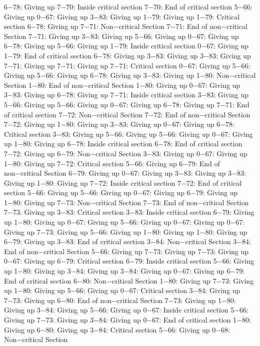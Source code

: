 6−78: Giving up
7−70: Inside critical section
7−70: End of critical section
5−66: Giving up
0−67: Giving up
3−83: Giving up
1−79: Giving up
1−79: Critical section
6−78: Giving up
7−71: Non−critical Section
7−71: End of non−critical Section
7−71: Giving up
3−83: Giving up
5−66: Giving up
0−67: Giving up
6−78: Giving up
5−66: Giving up
1−79: Inside critical section
0−67: Giving up
1−79: End of critical section
6−78: Giving up
3−83: Giving up
3−83: Giving up
7−71: Giving up
7−71: Giving up
7−71: Critical section
0−67: Giving up
5−66: Giving up
5−66: Giving up
6−78: Giving up
3−83: Giving up
1−80: Non−critical Section
1−80: End of non−critical Section
1−80: Giving up
0−67: Giving up
3−83: Giving up
6−78: Giving up
7−71: Inside critical section
3−83: Giving up
5−66: Giving up
5−66: Giving up
0−67: Giving up
6−78: Giving up
7−71: End of critical section
7−72: Non−critical Section
7−72: End of non−critical Section
7−72: Giving up
1−80: Giving up
3−83: Giving up
0−67: Giving up
6−78: Critical section
3−83: Giving up
5−66: Giving up
5−66: Giving up
0−67: Giving up
1−80: Giving up
6−78: Inside critical section
6−78: End of critical section
7−72: Giving up
6−79: Non−critical Section
3−83: Giving up
0−67: Giving up
1−80: Giving up
7−72: Critical section
5−66: Giving up
6−79: End of non−critical Section
6−79: Giving up
0−67: Giving up
3−83: Giving up
3−83: Giving up
1−80: Giving up
7−72: Inside critical section
7−72: End of critical section
5−66: Giving up
5−66: Giving up
0−67: Giving up
6−79: Giving up
1−80: Giving up
7−73: Non−critical Section
7−73: End of non−critical Section
7−73: Giving up
3−83: Critical section
3−83: Inside critical section
6−79: Giving up
1−80: Giving up
0−67: Giving up
5−66: Giving up
0−67: Giving up
0−67: Giving up
7−73: Giving up
5−66: Giving up
1−80: Giving up
1−80: Giving up
6−79: Giving up
3−83: End of critical section
3−84: Non−critical Section
3−84: End of non−critical Section
5−66: Giving up
7−73: Giving up
7−73: Giving up
0−67: Giving up
6−79: Critical section
6−79: Inside critical section
5−66: Giving up
1−80: Giving up
3−84: Giving up
3−84: Giving up
0−67: Giving up
6−79: End of critical section
6−80: Non−critical Section
1−80: Giving up
7−73: Giving up
1−80: Giving up
5−66: Giving up
0−67: Critical section
3−84: Giving up
7−73: Giving up
6−80: End of non−critical Section
7−73: Giving up
1−80: Giving up
3−84: Giving up
5−66: Giving up
0−67: Inside critical section
5−66: Giving up
7−73: Giving up
3−84: Giving up
0−67: End of critical section
1−80: Giving up
6−80: Giving up
3−84: Critical section
5−66: Giving up
0−68: Non−critical Section
